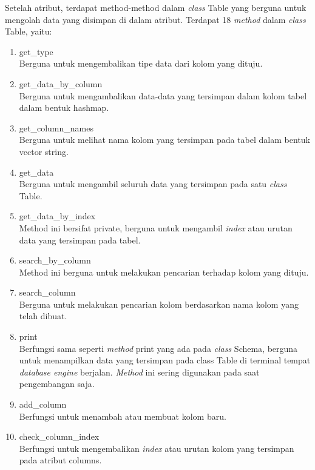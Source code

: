 Setelah atribut, terdapat method-method dalam \emph{class} Table yang berguna untuk mengolah data yang disimpan di dalam atribut. Terdapat 18 \emph{method} dalam \emph{class} Table, yaitu:

\begin{enumerate}
	\item get\_type \\
	Berguna untuk mengembalikan tipe data dari kolom yang dituju.

	\item get\_data\_by\_column \\
	Berguna untuk mengambalikan data-data yang tersimpan dalam kolom tabel dalam bentuk hashmap.

	\item get\_column\_names \\
	Berguna untuk melihat nama kolom yang tersimpan pada tabel dalam bentuk vector string.

	\item get\_data \\
	Berguna untuk mengambil seluruh data yang tersimpan pada satu \emph{class} Table.

	\item get\_data\_by\_index \\
	Method ini bersifat private, berguna untuk mengambil \emph{index} atau urutan data yang tersimpan pada tabel.

	\item search\_by\_column \\
	Method ini berguna untuk melakukan pencarian terhadap kolom yang dituju.

	\item search\_column \\
	Berguna untuk melakukan pencarian kolom berdasarkan nama kolom yang telah dibuat. 

	\item print \\
	Berfungsi sama seperti \emph{method} print yang ada pada \emph{class} Schema, berguna untuk menampilkan data yang tersimpan pada class
  Table di terminal tempat \emph{database engine} berjalan. \emph{Method} ini sering digunakan pada saat pengembangan saja.

	\item add\_column \\
	Berfungsi untuk menambah atau membuat kolom baru.

	\item check\_column\_index \\
	Berfungsi untuk mengembalikan \emph{index} atau urutan kolom yang tersimpan pada atribut columns.


\end{enumerate}
